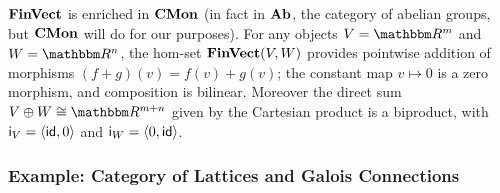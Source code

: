 
%

$\mathbf{FinVect}$ is enriched in $\mathbf{CMon}$ (in fact in $\mathbf{Ab}$, the category of abelian groups, but $\mathbf{CMon}$ will do for
our purposes). For any objects $V = \RR^m$ and $W = \RR^n$, the hom-set $\mathbf{FinVect}(V,W)$ provides pointwise
addition of morphisms $(f + g)(v) = f(v) + g(v)$; the constant map $v \mapsto 0$ is a zero morphism, and
composition is bilinear. Moreover the direct sum $V \biprod W \iso \RR^{m + n}$ given by the Cartesian product
is a biproduct, with $\mathsf{i}_{V} = \langle \mathsf{id}, 0\rangle$ and $\mathsf{i}_{W} = \langle 0, \mathsf{id}\rangle$.

\subsubsection{Example: Category of Lattices and Galois Connections}

